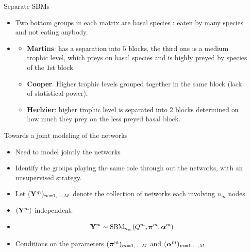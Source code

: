 \documentclass[compress,10pt]{beamer}
\begin{document}
\begin{frame}{Separate  SBMs}
   
   
   
 \begin{itemize}
  \item Two bottom groups in each matrix are basal species : 
  eaten by many species and not eating anybody. 
  \item 
  \begin{itemize}
  \item \textbf{Martins}:  has a separation into $5$ blocks, the third one is a medium trophic level, which preys on basal species and is highly preyed by species of the $1$st block.
 \item 
  \textbf{Cooper}. Higher trophic levels grouped together in the same block (lack of statistical power). 
  \item \textbf{Herlzier}:  higher trophic level is separated into $2$ blocks determined on how much they prey on the less preyed basal block. 
  
\end{itemize}
\end{itemize}
   
\end{frame}






 



\begin{frame}{Towards a joint modeling of the networks}
 
 
 \begin{itemize}
  \item Need to model jointly the networks
  \item Identify the groups playing the same role through out the networks, with an unsupervised strategy.  
  \item Let $(\mathbf{Y}^m)_{m=1,\dots,M}$ denote the collection of networks each involving $n_m$ nodes. 
  \item $(\mathbf{Y}^m)$ independent. 
  \item $$\mathbf{Y}^m \sim \mbox{SBM}_{n_m}(Q^m, \boldsymbol{\pi}^m, \boldsymbol{\alpha}^m)$$
  \item Conditions on the parameters $(\boldsymbol{\pi}^m)_{m=1,\dots,M}$ and $(\boldsymbol{\alpha}^m)_{m=1,\dots,M}$
 \end{itemize}
 \end{frame}
 
\end{document}
